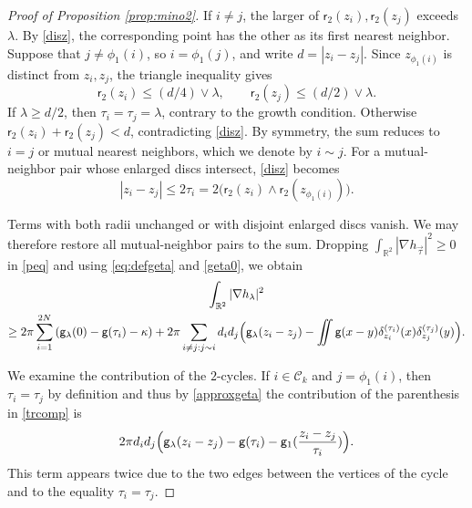 \documentclass[a4paper,10pt,leqno]{amsart}
\numberwithin{equation}{section}
\newcommand{\R}{\mathbb{R}}
\def\nab{\nabla}
\def\g{\mathsf{g}}
\def\rr{\mathsf{r}}
\begin{document}
\begin{proof}[Proof of Proposition \ref{prop:mino2}]
  If $i\ne j$, the larger of $\rr_2(z_i),\rr_2(z_j)$ exceeds $\lambda$. By \eqref{disz}, the corresponding point has the other as its first nearest neighbor. Suppose that $j\ne\phi_1(i)$, so $i=\phi_1(j)$, and write $d=|z_i-z_j|$. Since $z_{\phi_1(i)}$ is distinct from $z_i,z_j$, the triangle inequality gives
  \[
    \rr_2(z_i)\le(d/4)\vee\lambda,
    \qquad \rr_2(z_j)\le(d/2)\vee\lambda.
  \]
  If $\lambda\ge d/2$, then $\tau_i=\tau_j=\lambda$, contrary to the growth condition. Otherwise $\rr_2(z_i)+\rr_2(z_j)<d$, contradicting \eqref{disz}. By symmetry, the sum reduces to $i=j$ or mutual nearest neighbors, which we denote by $i\sim j$. For a mutual-neighbor pair whose enlarged discs intersect, \eqref{disz} becomes
  \[
    |z_i-z_j|\le2\tau_i=2\bigl(\rr_2(z_i)\wedge\rr_2(z_{\phi_1(i)})\bigr).
  \]

  Terms with both radii unchanged or with disjoint enlarged discs vanish. We may therefore restore all mutual-neighbor pairs to the sum. Dropping $\int_{\R^2}|\nab h_{\vec\tau}|^2\ge0$ in \eqref{peq} and using \eqref{eq:defgeta} and \eqref{geta0}, we obtain
  \begin{multline}\label{trcomp}
    \int_{\R^2} |\nab h_{\lambda}|^2 \\
    \ge 2\pi \sum_{i=1}^{2N} \left( \g_\lambda(0) - \g(\tau_i)-\kappa \right)+
    2\pi \sum_{i \neq j: j \sim i }
    d_i d_j \Bigl( \g_\lambda ( z_i-z_j) -\iint \g(x-y) \delta_{z_i}^{(\tau_i)}(x) \delta_{z_j}^{(\tau_j)} (y)\Bigr).
  \end{multline}

  We examine the contribution of the $2$-cycles. If $i\in \mathcal C_k$ and $j=\phi_1(i)$, then $\tau_i=\tau_j $ by definition and thus by \eqref{approxgeta} the contribution of the parenthesis in \eqref{trcomp} is
  \[2\pi d_id_j\Bigl( \g_\lambda(z_i-z_j)- \g(\tau_i) - \g_1(\frac{z_i-z_j}{\tau_i})\Bigr) .\]
  This term appears twice due to the two edges between the vertices of the cycle and to the equality $\tau_i=\tau_j$.


\end{proof}
\end{document}

